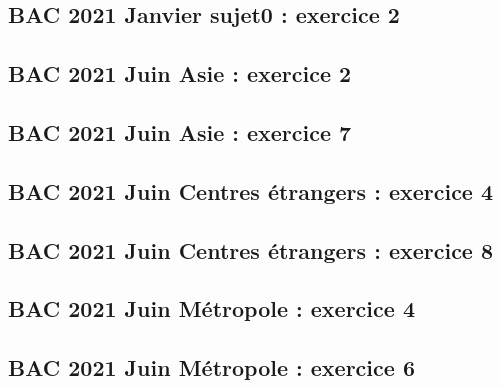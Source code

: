 \documentclass[lang=fr,edition=teacher,layout=sheet]{mxbook}
\begin{document}
\subsection*{BAC 2021 Janvier sujet0 : exercice 2}
\begingroup\endgroup
\par\bigskip
{}\subsection*{BAC 2021 Juin Asie : exercice 2}
\begingroup\endgroup
\par\bigskip
{}\subsection*{BAC 2021 Juin Asie : exercice 7}
\begingroup\endgroup
\par\bigskip
{}\subsection*{BAC 2021 Juin Centres étrangers : exercice 4}
\begingroup\endgroup
\par\bigskip
{}\subsection*{BAC 2021 Juin Centres étrangers : exercice 8}
\begingroup\endgroup
\par\bigskip
{}\subsection*{BAC 2021 Juin Métropole : exercice 4}
\begingroup\endgroup
\par\bigskip
{}\subsection*{BAC 2021 Juin Métropole : exercice 6}
\begingroup\endgroup
\par\bigskip
\end{document}
